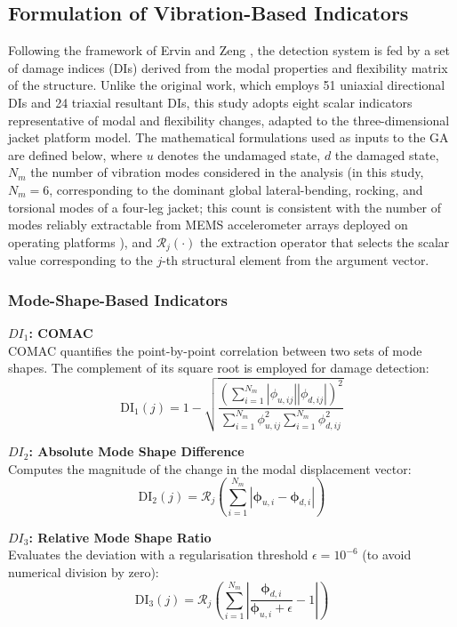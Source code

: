 \documentclass[a4paper,fleqn,nologo]{cas-dc}
\begin{document}
\subsection{Formulation of Vibration-Based Indicators}
Following the framework of Ervin and Zeng \citep{ervin2022index}, the detection system is fed by a set of damage indices (DIs) derived from the modal properties and flexibility matrix of the structure. Unlike the original work, which employs 51 uniaxial directional DIs and 24 triaxial resultant DIs, this study adopts eight scalar indicators representative of modal and flexibility changes, adapted to the three-dimensional jacket platform model. The mathematical formulations used as inputs to the GA are defined below, where $u$ denotes the undamaged state, $d$ the damaged state, $N_m$ the number of vibration modes considered in the analysis (in this study, $N_m = 6$, corresponding to the dominant global lateral-bending, rocking, and torsional modes of a four-leg jacket; this count is consistent with the number of modes reliably extractable from MEMS accelerometer arrays deployed on operating platforms \citep{ghsoub2018structural}), and $\mathcal{R}_j(\cdot)$ the extraction operator that selects the scalar value corresponding to the $j$-th structural element from the argument vector.

\subsubsection{Mode-Shape-Based Indicators}
\textbf{$DI_1$: COMAC} \\
COMAC quantifies the point-by-point correlation between two sets of mode shapes. The complement of its square root is employed for damage detection:
\begin{equation}
    \text{DI}_1(j) = 1 - \sqrt{ \frac{ \left( \sum_{i=1}^{N_m} |\phi_{u,ij}| |\phi_{d,ij}| \right)^2 }{ \sum_{i=1}^{N_m} \phi_{u,ij}^2 \sum_{i=1}^{N_m} \phi_{d,ij}^2 } }
\end{equation}

\textbf{$DI_2$: Absolute Mode Shape Difference} \\
Computes the magnitude of the change in the modal displacement vector:
\begin{equation}
    \text{DI}_2(j) = \mathcal{R}_j \left( \sum_{i=1}^{N_m} | \boldsymbol{\phi}_{u,i} - \boldsymbol{\phi}_{d,i} | \right)
\end{equation}

\textbf{$DI_3$: Relative Mode Shape Ratio} \\
Evaluates the deviation with a regularisation threshold $\epsilon = 10^{-6}$ (to avoid numerical division by zero):
\begin{equation}
    \text{DI}_3(j) = \mathcal{R}_j \left( \sum_{i=1}^{N_m} \left| \frac{\boldsymbol{\phi}_{d,i}}{\boldsymbol{\phi}_{u,i} + \epsilon} - 1 \right| \right)
\end{equation}
\end{document}
